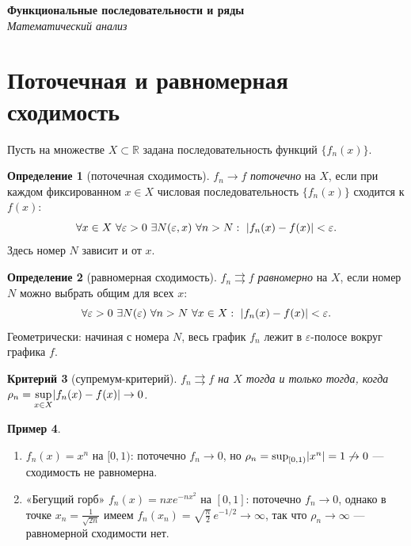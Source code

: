 \documentclass[11pt,a4paper]{article}
\newcommand{\coursename}{Математический анализ}
\newcommand{\doctitle}{Функциональные последовательности и ряды}
\theoremstyle{definition}
\newtheorem{definition}{Определение}[section]
\newtheorem{example}[definition]{Пример}
\theoremstyle{plain}
\newtheorem{criterion}[definition]{Критерий}
\newcommand{\R}{\mathbb{R}}
\newcommand{\eps}{\varepsilon}
\DeclarePairedDelimiter{\abs}{\lvert}{\rvert}
\begin{document}
\begin{center}
  {\LARGE\bfseries \doctitle}\\[4pt]
  {\large\itshape \coursename}
\end{center}
\vspace{6pt}

\section{Поточечная и равномерная сходимость}

Пусть на множестве $X\subset\R$ задана последовательность функций $\{f_n(x)\}$.

\begin{definition}[поточечная сходимость]
$f_n\to f$ \emph{поточечно} на $X$, если при каждом фиксированном $x\in X$ числовая
последовательность $\{f_n(x)\}$ сходится к $f(x)$:
\[
  \forall x\in X\ \forall\eps>0\ \exists N(\eps,x)\ \forall n>N:\ \abs{f_n(x)-f(x)}<\eps .
\]
Здесь номер $N$ зависит и от $x$.
\end{definition}

\begin{definition}[равномерная сходимость]
$f_n\rightrightarrows f$ \emph{равномерно} на $X$, если номер $N$ можно выбрать общим для всех $x$:
\[
  \forall\eps>0\ \exists N(\eps)\ \forall n>N\ \forall x\in X:\ \abs{f_n(x)-f(x)}<\eps .
\]
Геометрически: начиная с номера $N$, весь график $f_n$ лежит в $\eps$-полосе вокруг графика $f$.
\end{definition}

\begin{criterion}[супремум-критерий]
$f_n\rightrightarrows f$ на $X$ тогда и только тогда, когда
$\displaystyle\rho_n=\sup_{x\in X}\abs{f_n(x)-f(x)}\to0$.
\end{criterion}

\begin{example}\leavevmode
\begin{enumerate}[label=\arabic*),leftmargin=*]
  \item $f_n(x)=x^n$ на $[0,1)$: поточечно $f_n\to0$, но
        $\rho_n=\sup_{[0,1)}\abs{x^n}=1\not\to0$ — сходимость не равномерна.
  \item «Бегущий горб» $f_n(x)=nxe^{-nx^2}$ на $[0,1]$: поточечно $f_n\to0$, однако в точке
        $x_n=\tfrac{1}{\sqrt{2n}}$ имеем $f_n(x_n)=\sqrt{\tfrac{n}{2}}\,e^{-1/2}\to\infty$, так что
        $\rho_n\to\infty$ — равномерной сходимости нет.
\end{enumerate}
\end{example}
\end{document}
